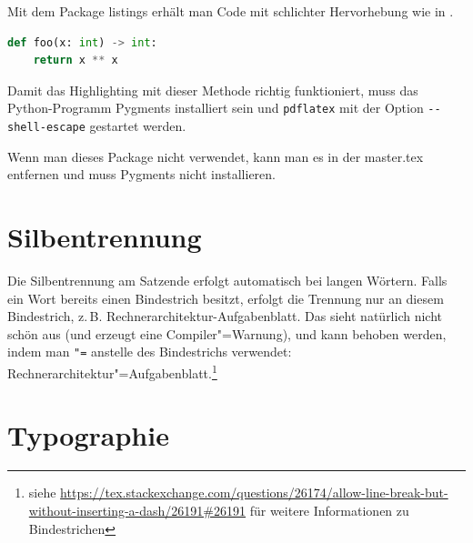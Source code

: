 Mit dem Package listings erhält man Code mit schlichter Hervorhebung wie in .

\begin{lstlisting}[language=Python, caption=Python-Beispiel, label={lst:lstlisting}]
def foo(x: int) -> int:
    return x ** x
\end{lstlisting}






Damit das Highlighting mit dieser Methode richtig funktioniert, muss das Python-Programm Pygments installiert sein und \texttt{pdflatex} mit der Option \texttt{-{}-shell-escape} gestartet werden.

Wenn man dieses Package nicht verwendet, kann man es in der master.tex entfernen und muss Pygments nicht installieren.

\section{Silbentrennung}

Die Silbentrennung am Satzende erfolgt automatisch bei langen Wörtern.
Falls ein Wort bereits einen Bindestrich besitzt, erfolgt die Trennung nur an diesem Bindestrich, z.\,B. Rechnerarchitektur-Aufgabenblatt.
Das sieht natürlich nicht schön aus (und erzeugt eine Compiler"=Warnung), und kann behoben werden, indem man \verb|"=| anstelle des Bindestrichs verwendet: Rechnerarchitektur"=Aufgabenblatt.\footnote{siehe \url{https://tex.stackexchange.com/questions/26174/allow-line-break-but-without-inserting-a-dash/26191\#26191} für weitere Informationen zu Bindestrichen}

\section{Typographie}

